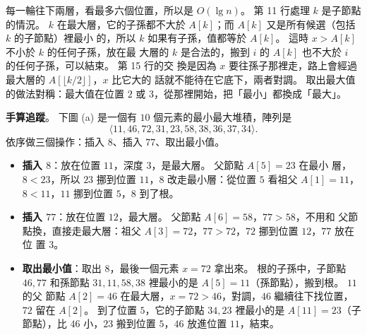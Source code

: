 每一輪往下兩層，看最多六個位置，所以是 $O(\lg n)$。 第 11 行處理 $k$ 是子節點的情況。
$k$ 在最大層，它的子孫都不大於 $A[k]$；而 $A[k]$ 又是所有候選（包括 $k$ 的子節點）裡最小
的，所以 $k$ 如果有子孫，值都等於 $A[k]$。 這時 $x > A[k]$ 不小於 $k$ 的任何子孫，放在最
大層的 $k$ 是合法的，搬到 $i$ 的 $A[k]$ 也不大於 $i$ 的任何子孫，可以結束。 第 15 行的交
換是因為 $x$ 要往孫子那裡走，路上會經過最大層的 $A[\lfloor k/2 \rfloor]$，$x$ 比它大的
話就不能待在它底下，兩者對調。 取出最大值的做法對稱：最大值在位置 $2$ 或 $3$，從那裡開始，把「最小」都換成「最大」。

\textbf{手算追蹤}。 下圖 (a) 是一個有 $10$ 個元素的最小最大堆積，陣列是
\[
\langle 11, 46, 72, 31, 23, 58, 38, 36, 37, 34 \rangle.
\]
依序做三個操作：插入 $8$、插入 $77$、取出最小值。

\begin{center}

\label{fig:hp-minmax}
\end{center}

\begin{itemize}
\item \textbf{插入 $8$}：放在位置 $11$，深度 $3$，是最大層。 父節點 $A[5] = 23$ 在最小
層，$8 < 23$，所以 $23$ 挪到位置 $11$，$8$ 改走最小層：從位置 $5$ 看祖父 $A[1] = 11$，
$8 < 11$，$11$ 挪到位置 $5$，$8$ 到了根。
\item \textbf{插入 $77$}：放在位置 $12$，最大層。 父節點 $A[6] = 58$，$77 > 58$，不用和
父節點換，直接走最大層：祖父 $A[3] = 72$，$77 > 72$，$72$ 挪到位置 $12$，$77$ 放在位
置 $3$。
\item \textbf{取出最小值}：取出 $8$，最後一個元素 $x = 72$ 拿出來。 根的子孫中，子節點
$46, 77$ 和孫節點 $31, 11, 58, 38$ 裡最小的是 $A[5] = 11$（孫節點），搬到根。 $11$ 的父
節點 $A[2] = 46$ 在最大層，$x = 72 > 46$，對調，$46$ 繼續往下找位置，$72$ 留在
$A[2]$。 到了位置 $5$，它的子節點 $34, 23$ 裡最小的是 $A[11] = 23$（子節點），比 $46$
小，$23$ 搬到位置 $5$，$46$ 放進位置 $11$，結束。
\end{itemize}

